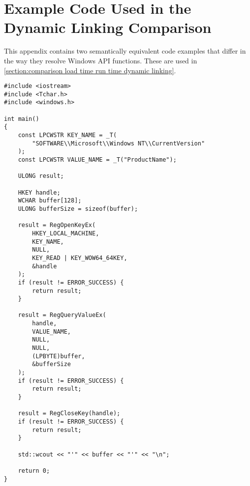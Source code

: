 \chapter{Example Code Used in the Dynamic Linking Comparison}\label{appendix:source code run time linking}
This appendix contains two semantically equivalent code examples that differ in the way they resolve Windows API functions. These are used in \autoref{section:comparison load time run time dynamic linking}.

\begin{lstlisting}[caption={Example code that uses load-time dynamically linked function calls.}, label={listing:load-time dynamic linking code}, captionpos=b]
#include <iostream>
#include <Tchar.h>
#include <windows.h>

int main()
{
    const LPCWSTR KEY_NAME = _T(
        "SOFTWARE\\Microsoft\\Windows NT\\CurrentVersion"
    );
    const LPCWSTR VALUE_NAME = _T("ProductName");

    ULONG result;

    HKEY handle;
    WCHAR buffer[128];
    ULONG bufferSize = sizeof(buffer);

    result = RegOpenKeyEx(
        HKEY_LOCAL_MACHINE,
        KEY_NAME,
        NULL,
        KEY_READ | KEY_WOW64_64KEY,
        &handle
    );
    if (result != ERROR_SUCCESS) {
        return result;
    }

    result = RegQueryValueEx(
        handle,
        VALUE_NAME,
        NULL,
        NULL,
        (LPBYTE)buffer,
        &bufferSize
    );
    if (result != ERROR_SUCCESS) {
        return result;
    }

    result = RegCloseKey(handle);
    if (result != ERROR_SUCCESS) {
        return result;
    }

    std::wcout << "'" << buffer << "'" << "\n";

    return 0;
}
\end{lstlisting}

